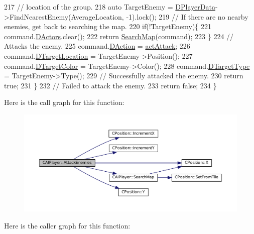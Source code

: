 \begin{DoxyCode}
217         \textcolor{comment}{// location of the group.}
218         \textcolor{keyword}{auto} TargetEnemy = \hyperlink{classCAIPlayer_a83b5113c8f7e80df54940b647c5ee2e6}{DPlayerData}->FindNearestEnemy(AverageLocation, -1).lock();
219         \textcolor{comment}{// If there are no nearby enemies, get back to searching the map.}
220         \textcolor{keywordflow}{if}(!TargetEnemy)\{
221             command.\hyperlink{structSPlayerCommandRequest_aa37fc01519676345703d78b9f573894a}{DActors}.clear();
222             \textcolor{keywordflow}{return} \hyperlink{classCAIPlayer_afafbe8fc589e09a16ae1f02f2794d7b0}{SearchMap}(command);
223         \}
224         \textcolor{comment}{// Attacks the enemy.}
225         command.\hyperlink{structSPlayerCommandRequest_a80897bbccf2c4e0b148a7aa815a926c6}{DAction} = \hyperlink{GameDataTypes_8h_a35b98ce26aca678b03c6f9f76e4778ceaf90bc0c36c70d816217d0d4b08b0ba4c}{actAttack};
226         command.\hyperlink{structSPlayerCommandRequest_a701702b94ca2fd2738e95ef6711dd41a}{DTargetLocation} = TargetEnemy->Position();
227         command.\hyperlink{structSPlayerCommandRequest_a3690a5117efe6214d92f18d672b5714f}{DTargetColor} = TargetEnemy->Color();
228         command.\hyperlink{structSPlayerCommandRequest_a864e47c641127665751091876a6d3c5e}{DTargetType} = TargetEnemy->Type(); 
229         \textcolor{comment}{// Successfully attacked the enemy.}
230         \textcolor{keywordflow}{return} \textcolor{keyword}{true};
231     \}
232     \textcolor{comment}{// Failed to attack the enemy.}
233     \textcolor{keywordflow}{return} \textcolor{keyword}{false};    
234 \}
\end{DoxyCode}
Here is the call graph for this function\+:\nopagebreak
\begin{figure}[H]
\begin{center}
\leavevmode
\includegraphics[width=350pt]{classCAIPlayer_adf7feeba7debf9f19b000887616d7bfb_cgraph}
\end{center}
\end{figure}
Here is the caller graph for this function\+:\nopagebreak
